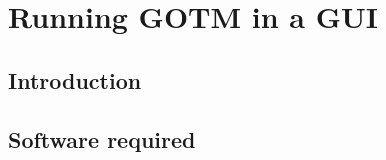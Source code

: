 %
%

\section{Running GOTM in a GUI\label{sec:guiIntro}}

\subsection{Introduction}

\subsection{Software required}


